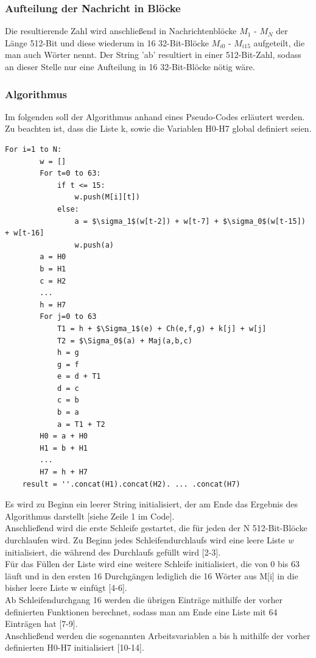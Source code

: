 \subsubsection{Aufteilung der Nachricht in Blöcke}
Die resultierende Zahl wird anschließend in Nachrichtenblöcke $M_1$ - $M_N$ der Länge 512-Bit und diese wiederum in 16 32-Bit-Blöcke $M_{i0}$ - $M_{i15}$ aufgeteilt, die man auch Wörter nennt. Der String 'ab' resultiert in einer 512-Bit-Zahl, sodass an dieser Stelle nur eine Aufteilung in 16 32-Bit-Blöcke nötig wäre.

\subsubsection{Algorithmus}
Im folgenden soll der Algorithmus anhand eines Pseudo-Codes erläutert werden. Zu beachten ist, dass die Liste k, sowie die Variablen H0-H7 global definiert seien.
\begin{lstlisting}[mathescape,caption={Pseudocode zu SHA256},captionpos=b]
	For i=1 to N:
		w = []
		For t=0 to 63:
			if t <= 15:
				w.push(M[i][t])
			else:
				a = $\sigma_1$(w[t-2]) + w[t-7] + $\sigma_0$(w[t-15]) + w[t-16]
				w.push(a)
		a = H0
		b = H1
		c = H2
		...
		h = H7
		For j=0 to 63
			T1 = h + $\Sigma_1$(e) + Ch(e,f,g) + k[j] + w[j]
			T2 = $\Sigma_0$(a) + Maj(a,b,c)
			h = g
			g = f
			e = d + T1
			d = c
			c = b
			b = a
			a = T1 + T2
		H0 = a + H0
		H1 = b + H1
		...
		H7 = h + H7
	result = ''.concat(H1).concat(H2). ... .concat(H7)
\end{lstlisting}
Es wird zu Beginn ein leerer String initialisiert, der am Ende das Ergebnis des Algorithmus darstellt [siehe Zeile 1 im Code].\\
Anschließend wird die erste Schleife gestartet, die für jeden der N 512-Bit-Blöcke durchlaufen wird. Zu Beginn jedes Schleifendurchlaufs wird eine leere Liste \emph{w} initialisiert, die während des Durchlaufs gefüllt wird [2-3].\\
Für das Füllen der Liste wird eine weitere Schleife initialisiert, die von 0 bis 63 läuft und in den ersten 16 Durchgängen lediglich die 16 Wörter aus M[i] in die bisher leere Liste w einfügt [4-6]. \\
Ab Schleifendurchgang 16 werden die übrigen Einträge mithilfe der vorher definierten Funktionen berechnet, sodass man am Ende eine Liste mit 64 Einträgen hat [7-9].\\
Anschließend werden die sogenannten Arbeitsvariablen a bis h mithilfe der vorher definierten H0-H7 initialisiert [10-14].\\
